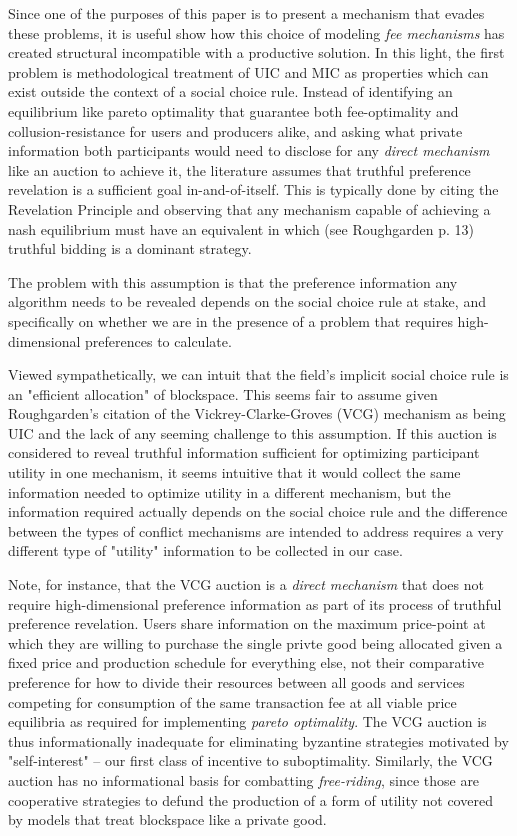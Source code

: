 Since one of the purposes of this paper is to present a mechanism that evades these problems, it is useful show how this choice of modeling \textit{fee mechanisms} has created structural incompatible with a productive solution. In this light, the first problem is methodological treatment of UIC and MIC as properties which can exist outside the context of a social choice rule. Instead of identifying an equilibrium like pareto optimality that guarantee both fee-optimality and collusion-resistance for users and producers alike, and asking what private information both participants would need to disclose for any \textit{direct mechanism} like an auction to achieve it, the literature assumes that truthful preference revelation is a sufficient goal in-and-of-itself. This is typically done by citing the Revelation Principle and observing that any mechanism capable of achieving a nash equilibrium must have an equivalent in which (see Roughgarden p. 13) truthful bidding is a dominant strategy.

The problem with this assumption is that the preference information any algorithm needs to be revealed depends on the social choice rule at stake, and specifically on whether we are in the presence of a problem that requires high-dimensional preferences to calculate.

Viewed sympathetically, we can intuit that the field's implicit social choice rule is an "efficient allocation" of blockspace. This seems fair to assume given Roughgarden's citation of the Vickrey-Clarke-Groves (VCG) mechanism as being UIC and the lack of any seeming challenge to this assumption. If this auction is considered to reveal truthful information sufficient for optimizing participant utility in one mechanism, it seems intuitive that it would collect the same information needed to optimize utility in a different mechanism, but the information required actually depends on the social choice rule and the difference between the types of conflict mechanisms are intended to address requires a very different type of "utility" information to be collected in our case.

Note, for instance, that the VCG auction is a \textit{direct mechanism} that does not require high-dimensional preference information as part of its process of truthful preference revelation. Users share information on the maximum price-point at which they are willing to purchase the single privte good being allocated given a fixed price and production schedule for everything else, not their comparative preference for how to divide their resources between all goods and services competing for consumption of the same transaction fee at all viable price equilibria as required for implementing \textit{pareto optimality}. The VCG auction is thus informationally inadequate for eliminating byzantine strategies motivated by "self-interest" -- our first class of incentive to suboptimality. Similarly, the VCG auction has no informational basis for combatting \textit{free-riding}, since those are cooperative strategies to defund the production of a form of utility not covered by models that treat blockspace like a private good.







